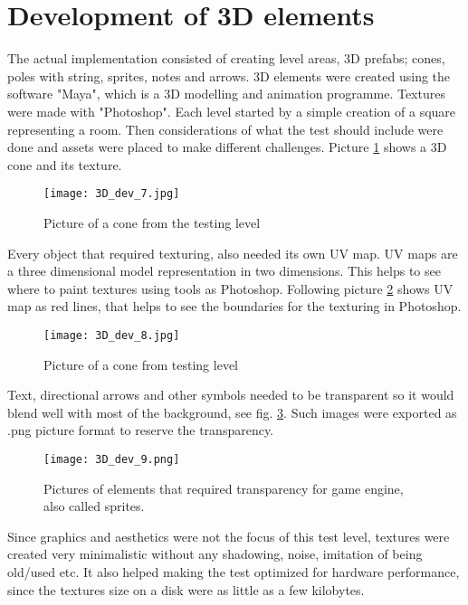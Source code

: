 \section{Development of 3D elements}
The actual implementation consisted of creating level areas, 3D prefabs; cones, poles with string, sprites, notes and arrows. 3D elements were created using the software "Maya", which is a 3D modelling and animation programme. Textures were made with "Photoshop". Each level started by a simple creation of a square representing a room. Then considerations of what the test should include were done and assets were placed to make different challenges. Picture \ref{3dDevelopment1} shows a 3D cone and its texture.
\begin{figure}[H]
\centering
\texttt{[image: 3D\_dev\_7.jpg]}
\caption{Picture of a cone from the testing level}
\label {3dDevelopment1}
\end{figure}
Every object that required texturing, also needed its own UV map. UV maps are a three dimensional model representation in two dimensions. This helps to see where to paint textures using tools as Photoshop. Following picture \ref{3dDevelopment2} shows UV map as red lines, that helps to see the boundaries for the texturing in Photoshop.
\begin{figure}[H]
\centering
\texttt{[image: 3D\_dev\_8.jpg]}
\caption{Picture of a cone from testing level}
\label {3dDevelopment2}
\end{figure}
Text, directional arrows and other symbols needed to be transparent so it would blend well with most of the background, see fig. \ref {3dDevelopment3}. Such images were exported as .png picture format to reserve the transparency. 

\begin{figure}[H]
\centering
\texttt{[image: 3D\_dev\_9.png]}
\caption{Pictures of elements that required transparency for game engine, also called sprites.}
\label{3dDevelopment3}
\end{figure}

Since graphics and aesthetics were not the focus of this test level, textures were created very minimalistic without any shadowing, noise, imitation of being old/used etc. It also helped making the test optimized for hardware performance, since the textures size on a disk were as little as a few kilobytes.

